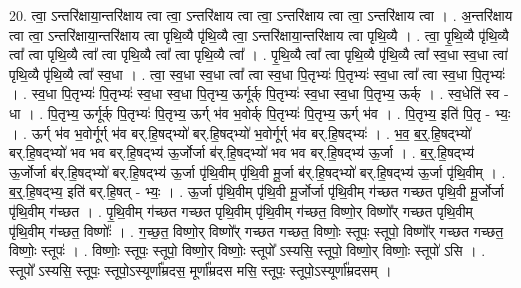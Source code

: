 \documentclass[17pt]{extarticle}
\begin{document}
20. त्वा॒ ऽन्तरि॑क्षाया॒न्तरि॑क्षाय त्वा त्वा॒ ऽन्तरि॑क्षाय त्वा त्वा॒ ऽन्तरि॑क्षाय त्वा त्वा॒ ऽन्तरि॑क्षाय त्वा । . अ॒न्तरि॑क्षाय त्वा त्वा॒ ऽन्तरि॑क्षाया॒न्तरि॑क्षाय त्वा पृथि॒व्यै पृ॑थि॒व्यै त्वा॒ ऽन्तरि॑क्षाया॒न्तरि॑क्षाय त्वा पृथि॒व्यै । . त्वा॒ पृ॒थि॒व्यै पृ॑थि॒व्यै त्वा᳚ त्वा पृथि॒व्यै त्वा᳚ त्वा पृथि॒व्यै त्वा᳚ त्वा पृथि॒व्यै त्वा᳚ । . पृ॒थि॒व्यै त्वा᳚ त्वा पृथि॒व्यै पृ॑थि॒व्यै त्वा᳚ स्व॒धा स्व॒धा त्वा॑ पृथि॒व्यै पृ॑थि॒व्यै त्वा᳚ स्व॒धा । . त्वा॒ स्व॒धा स्व॒धा त्वा᳚ त्वा स्व॒धा पि॒तृभ्यः॑ पि॒तृभ्यः॑ स्व॒धा त्वा᳚ त्वा स्व॒धा पि॒तृभ्यः॑ । . स्व॒धा पि॒तृभ्यः॑ पि॒तृभ्यः॑ स्व॒धा स्व॒धा पि॒तृभ्य॒ ऊर्गूर्क् पि॒तृभ्यः॑ स्व॒धा स्व॒धा पि॒तृभ्य॒ ऊर्क् । . स्व॒धेति॑ स्व - धा । . पि॒तृभ्य॒ ऊर्गूर्क् पि॒तृभ्यः॑ पि॒तृभ्य॒ ऊर्ग् भ॑व भ॒वोर्क् पि॒तृभ्यः॑ पि॒तृभ्य॒ ऊर्ग् भ॑व । . पि॒तृभ्य॒ इति॑ पि॒तृ - भ्यः॒ । . ऊर्ग् भ॑व भ॒वोर्गूर्ग् भ॑व बर्.हि॒षद्भ्यो॑ बर्.हि॒षद्भ्यो॑ भ॒वोर्गूर्ग् भ॑व बर्.हि॒षद्भ्यः॑ । . भ॒व॒ ब॒र्॒.हि॒षद्भ्यो॑ बर्.हि॒षद्भ्यो॑ भव भव बर्.हि॒षद्भ्य॑ ऊ॒र्जोर्जा ब॑र्.हि॒षद्भ्यो॑ भव भव बर्.हि॒षद्भ्य॑ ऊ॒र्जा । . ब॒र्॒.हि॒षद्भ्य॑ ऊ॒र्जोर्जा ब॑र्.हि॒षद्भ्यो॑ बर्.हि॒षद्भ्य॑ ऊ॒र्जा पृ॑थि॒वीम् पृ॑थि॒वी मू॒र्जा ब॑र्.हि॒षद्भ्यो॑ बर्.हि॒षद्भ्य॑ ऊ॒र्जा पृ॑थि॒वीम् । . ब॒र्॒.हि॒षद्भ्य॒ इति॑ बर्.हि॒षत् - भ्यः॒ । . ऊ॒र्जा पृ॑थि॒वीम् पृ॑थि॒वी मू॒र्जोर्जा पृ॑थि॒वीम् ग॑च्छत गच्छत पृथि॒वी मू॒र्जोर्जा पृ॑थि॒वीम् ग॑च्छत । . पृ॒थि॒वीम् ग॑च्छत गच्छत पृथि॒वीम् पृ॑थि॒वीम् ग॑च्छत॒ विष्णो॒र् विष्णो᳚र् गच्छत पृथि॒वीम् पृ॑थि॒वीम् ग॑च्छत॒ विष्णोः᳚ । . ग॒च्छ॒त॒ विष्णो॒र् विष्णो᳚र् गच्छत गच्छत॒ विष्णोः॒ स्तूपः॒ स्तूपो॒ विष्णो᳚र् गच्छत गच्छत॒ विष्णोः॒ स्तूपः॑ । . विष्णोः॒ स्तूपः॒ स्तूपो॒ विष्णो॒र् विष्णोः॒ स्तूपो᳚ ऽस्यसि॒ स्तूपो॒ विष्णो॒र् विष्णोः॒ स्तूपो॑ ऽसि । . स्तूपो᳚ ऽस्यसि॒ स्तूपः॒ स्तूपो॒ऽस्यूर्णा᳚म्रदस॒ मूर्णा᳚म्रदस मसि॒ स्तूपः॒ स्तूपो॒ऽस्यूर्णा᳚म्रदसम् । \newline
\end{document}
